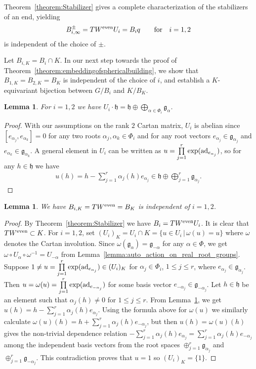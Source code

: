 \documentclass[pdftex]{sigma}
\numberwithin{equation}{section}
\newtheorem{Lemma}[Theorem]{Lemma}
\def\a{\alpha}
\def\roots{{\Phi}}
\def\fg{\mathfrak{g}}
\def\fh{\mathfrak{h}}
\begin{document}
Theorem~\ref{theorem:Stabilizer} gives a complete characterization of the stabilizers of an end, yielding
\[B_{i,\infty}^\pm = T W^{\rm even} U_i = B_i q\qquad \textrm{for}\quad i =1,2\]
is independent of the choice of $\pm$.

Let $B_{i,K} = B_i \cap K$. In our next step towards the proof of Theorem~\ref{theorem:embeddingofsphericalbuilding},
we show that $B_{1,K} = B_{2,K} = B_K$ is independent of the choice of $i$, and establish a $K$-equivariant bijection between
$G/B_i$ and $K/B_K$.

\begin{Lemma}\label{lemma:U-orbit}
For $i=1,2$ we have $U_i \cdot \fh = \fh\oplus \bigoplus_{\a\in\roots_i} \fg_\a$.
\end{Lemma}

\begin{proof}With our assumptions on the rank $2$ Cartan matrix, $U_i$ is abelian since $[e_{\a_j}, e_{\a_k}] = 0$ for any two roots
$\a_j,\a_k\in\roots_i$ and for any root vectors $e_{\a_j}\in\fg_{\a_j}$ and $e_{\a_k}\in\fg_{\a_k}$. A general element in $U_i$ can be
written as $u = \prod\limits_{j=1}^r \exp({\rm ad}_{e_{\a_j}})$, so for any $h\in\fh$ we have
\begin{gather*}
u(h) = h - \sum_{j=1}^r \a_j(h) e_{\a_j} \in \fh \oplus \bigoplus_{j=1}^r \fg_{\a_j}.\tag*{\qed}
\end{gather*}\renewcommand{\qed}{}
\end{proof}

\begin{Lemma}{\label{Bcomponent}}We have $B_{i,K} =T W^{\rm even} = B_K$ is independent of $i=1,2$.
\end{Lemma}

\begin{proof}By Theorem~\ref{theorem:Stabilizer} we have $B_i = T W^{\rm even} U_i$. It is clear that $T W^{\rm even} \subset K$. For $i=1,2$, set $(U_i)_K = U_i\cap K=\{u\in U_i \,|\, \omega(u)=u\}$ where $\omega$ denotes the Cartan involution. Since $\omega(\fg_\a) = \fg_{-\a}$ for any $\a\in\roots$, we get $\omega\circ U_\a \circ \omega ^{-1} = U_{-\a}$ from Lemma~\ref{lemma:auto_action_on_real_root_groups}.
Suppose $1\neq u = \prod\limits_{j=1}^r \exp({\rm ad}_{e_{\a_j}})\in(U_i)_K$ for $\a_j\in\roots_i$, $1\leq j\leq r$, where $e_{\a_j}\in\fg_{\a_j}$. Then $u = \omega(u) = \prod\limits_{j=1}^r \exp({\rm ad}_{e_{-\a_j}})$ for some basis vector $e_{-\a_j}\in\fg_{-\a_j}$.
Let $h\in\fh$ be an element such that $\a_j(h)\neq 0$ for $1\leq j\leq r$. From Lemma~\ref{lemma:U-orbit}, we get $u(h) = h - \sum\limits_{j=1}^r \a_j(h) e_{\a_j}$. Using the formula above for $\omega(u)$ we similarly calculate $\omega(u)(h) = h + \sum\limits_{j=1}^r \a_j(h) e_{-\a_j}$, but then $u(h) = \omega(u)(h)$ gives the non-trivial dependence relation $- \sum\limits_{j=1}^r \a_j(h) e_{\a_j} = \sum\limits_{j=1}^r \a_j(h) e_{-\a_j}$ among the independent basis vectors from the root spaces
$\oplus_{j=1}^r \fg_{\a_j}$ and $\oplus_{j=1}^r \fg_{-\a_j}$. This contradiction proves that $u = 1$ so $(U_i)_K=\{1\}$.
\end{proof}
\end{document}
